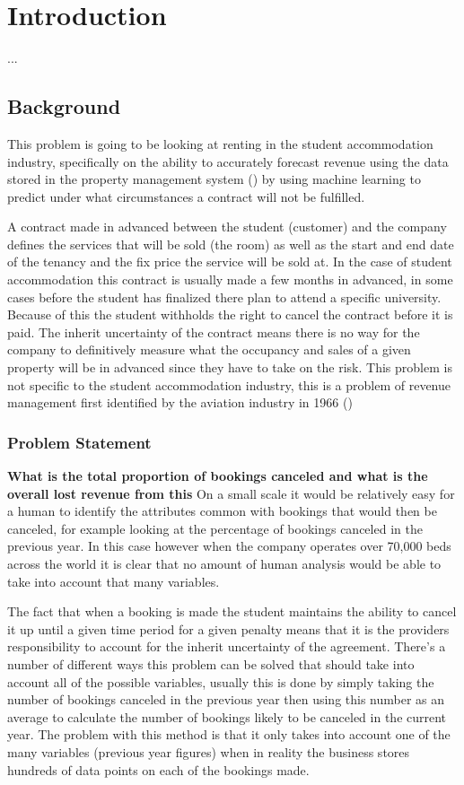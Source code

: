 \chapter{Introduction}

...
\section{Background}
This problem is going to be looking at renting in the student accommodation industry, specifically on the ability to accurately forecast revenue using the data stored in the property management system (\cite{Jain2006IntellectualPerspective}) by using machine learning to predict under what circumstances a contract will not be fulfilled.\par 

A contract made in advanced between the student (customer) and the company defines the services that will be sold (the room) as well as the start and end date of the tenancy and the fix price the service will be sold at. In the case of student accommodation this contract is usually made a few months in advanced, in some cases before the student has finalized there plan to attend a specific university. Because of this the student withholds the right to cancel the contract before it is paid. The inherit uncertainty of the contract means there is no way for the company to definitively measure what the occupancy and sales of a given property will be in advanced since they have to take on the risk. This problem is not specific to the student accommodation industry, this is a problem of revenue management first identified by the aviation industry in 1966  (\cite{Chiang2007AnResearch})


\subsection{Problem Statement}
\textbf{What is the total proportion of bookings canceled and what is the overall lost revenue from this} 
On a small scale it would be relatively easy for a human to identify the attributes common with bookings that would then be canceled, for example looking at the percentage of bookings canceled in the previous year. In this case however when the company operates over 70,000 beds across the world it is clear that no amount of human analysis would be able to take into account that many variables. \par

The fact that when a booking is made the student maintains the ability to cancel it up until a given time period for a given penalty means that it is the providers responsibility to account for the inherit uncertainty of the agreement. There's a number of different ways this problem can be solved that should take into account all of the possible variables, usually this is done by simply taking the number of bookings canceled in the previous year then using this number as an average to calculate the number of bookings likely to be canceled in the current year. The problem with this method is that it only takes into account one of the many variables (previous year figures) when in reality the business stores hundreds of data points on each of the bookings made.

